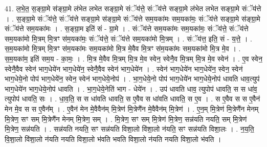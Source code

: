 \documentclass[17pt]{extarticle}
\begin{document}
41. ल॒भे॒त॒ स॒ङ्ग्रा॒मे स॑ङ्ग्रा॒मे ल॑भेत लभेत सङ्ग्रा॒मे संॅय॑त्ते॒ संॅय॑त्ते सङ्ग्रा॒मे ल॑भेत लभेत सङ्ग्रा॒मे संॅय॑त्ते । . स॒ङ्ग्रा॒मे संॅय॑त्ते॒ संॅय॑त्ते सङ्ग्रा॒मे स॑ङ्ग्रा॒मे संॅय॑त्ते सम॒यका॑मः सम॒यका॑मः॒ संॅय॑त्ते सङ्ग्रा॒मे स॑ङ्ग्रा॒मे संॅय॑त्ते सम॒यका॑मः । . स॒ङ्ग्रा॒म इति॑ सं - ग्रा॒मे । . संॅय॑त्ते सम॒यका॑मः सम॒यका॑मः॒ संॅय॑त्ते॒ संॅय॑त्ते सम॒यका॑मो मि॒त्रम् मि॒त्रꣳ स॑म॒यका॑मः॒ संॅय॑त्ते॒ संॅय॑त्ते सम॒यका॑मो मि॒त्रम् । . संॅय॑त्त॒ इति॒ सं - य॒त्ते॒ । . स॒म॒यका॑मो मि॒त्रम् मि॒त्रꣳ स॑म॒यका॑मः सम॒यका॑मो मि॒त्र मे॒वैव मि॒त्रꣳ स॑म॒यका॑मः सम॒यका॑मो मि॒त्र मे॒व । . स॒म॒यका॑म॒ इति॑ सम॒य - का॒मः॒ । . मि॒त्र मे॒वैव मि॒त्रम् मि॒त्र मे॒व स्वेन॒ स्वेनै॒व मि॒त्रम् मि॒त्र मे॒व स्वेन॑ । . ए॒व स्वेन॒ स्वेनै॒वैव स्वेन॑ भाग॒धेये॑न भाग॒धेये॑न॒ स्वेनै॒वैव स्वेन॑ भाग॒धेये॑न । . स्वेन॑ भाग॒धेये॑न भाग॒धेये॑न॒ स्वेन॒ स्वेन॑ भाग॒धेये॒नो पोप॑ भाग॒धेये॑न॒ स्वेन॒ स्वेन॑ भाग॒धेये॒नोप॑ । . भा॒ग॒धेये॒नो पोप॑ भाग॒धेये॑न भाग॒धेये॒नोप॑ धावति धाव॒त्युप॑ भाग॒धेये॑न भाग॒धेये॒नोप॑ धावति । . भा॒ग॒धेये॒नेति॑ भाग - धेये॑न । . उप॑ धावति धाव॒ त्युपोप॑ धावति॒ स स धा॑व॒ त्युपोप॑ धावति॒ सः । . धा॒व॒ति॒ स स धा॑वति धावति॒ स ए॒वैव स धा॑वति धावति॒ स ए॒व । . स ए॒वैव स स ए॒वैन॑ मेन मे॒व स स ए॒वैन᳚म् । . ए॒वैन॑ मेन मे॒वैवैन॑म् मि॒त्रेण॑ मि॒त्रेणै॑न मे॒वैवैन॑म् मि॒त्रेण॑ । . ए॒न॒म् मि॒त्रेण॑ मि॒त्रेणै॑न मेनम् मि॒त्रेण॒ सꣳ सम् मि॒त्रेणै॑न मेनम् मि॒त्रेण॒ सम् । . मि॒त्रेण॒ सꣳ सम् मि॒त्रेण॑ मि॒त्रेण॒ सन्न॑यति नयति॒ सम् मि॒त्रेण॑ मि॒त्रेण॒ सन्न॑यति । . सन्न॑यति नयति॒ सꣳ सन्न॑यति विशा॒लो वि॑शा॒लो न॑यति॒ सꣳ सन्न॑यति विशा॒लः । . न॒य॒ति॒ वि॒शा॒लो वि॑शा॒लो न॑यति नयति विशा॒लो भ॑वति भवति विशा॒लो न॑यति नयति विशा॒लो भ॑वति । \newline
\pagebreak
{}
\end{document}
